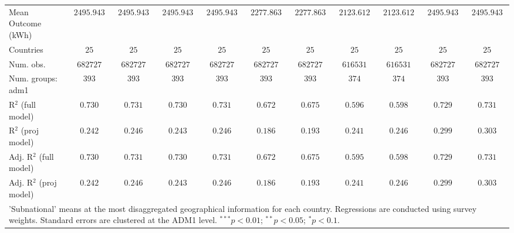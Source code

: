 \begin{table}[H]
\begin{center}
\begin{tabular}{l c c c c c c c c c c}
Mean Outcome (kWh)              & $2495.943$    & $2495.943$     & $2495.943$    & $2495.943$     & $2277.863$    & $2277.863$     & $2123.612$    & $2123.612$     & $2495.943$    & $2495.943$     \\
Countries                       & $25$          & $25$           & $25$          & $25$           & $25$          & $25$           & $25$          & $25$           & $25$          & $25$           \\
Num. obs.                       & $682727$      & $682727$       & $682727$      & $682727$       & $682727$      & $682727$       & $616531$      & $616531$       & $682727$      & $682727$       \\
Num. groups: adm1               & $393$         & $393$          & $393$         & $393$          & $393$         & $393$          & $374$         & $374$          & $393$         & $393$          \\
R$^2$ (full model)              & $0.730$       & $0.731$        & $0.730$       & $0.731$        & $0.672$       & $0.675$        & $0.596$       & $0.598$        & $0.729$       & $0.731$        \\
R$^2$ (proj model)              & $0.242$       & $0.246$        & $0.243$       & $0.246$        & $0.186$       & $0.193$        & $0.241$       & $0.246$        & $0.299$       & $0.303$        \\
Adj. R$^2$ (full model)         & $0.730$       & $0.731$        & $0.730$       & $0.731$        & $0.672$       & $0.675$        & $0.595$       & $0.598$        & $0.729$       & $0.731$        \\
Adj. R$^2$ (proj model)         & $0.242$       & $0.246$        & $0.243$       & $0.246$        & $0.186$       & $0.193$        & $0.241$       & $0.246$        & $0.299$       & $0.303$        \\
\hline
\multicolumn{11}{l}{\scriptsize{'Subnational' means at the most disaggregated geographical information for each country. Regressions are conducted using survey weights.
       Standard errors are clustered at the ADM1 level. $^{***}p<0.01$; $^{**}p<0.05$; $^{*}p<0.1$.}}
\end{tabular}
\label{main: tableA3}
\end{center}
\end{table}
